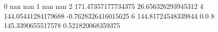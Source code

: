 0 nan nan
1 nan nan
2 171.47357177734375 26.656326293945312
4 144.05441284179688 -0.7628326416015625
6 144.81724548339844 0.0
8 145.3390655517578 0.521820068359375
